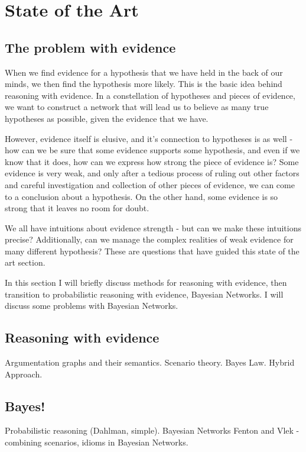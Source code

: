 
\chapter[State of the Art]{State of the Art}

\section{The problem with evidence}

When we find evidence for a hypothesis that we have held in the back of our minds, we then find the hypothesis more likely. 
This is the basic idea behind reasoning with evidence. In a constellation of hypotheses and pieces of evidence, we want
to construct a network that will lead us to believe as many true hypotheses as possible, given the evidence that we have.

However, evidence itself is elusive, and it's connection to hypotheses is as well - how can we be sure that some evidence supports
some hypothesis, and even if we know that it does, how can we express how strong the piece of evidence is? Some evidence
is very weak, and only after a tedious process of ruling out other factors and careful investigation and collection of other pieces
of evidence, we can come to a conclusion about a hypothesis. On the other hand, some evidence is so strong that it leaves no room for doubt.

We all have intuitions about evidence strength - but can we make these intuitions precise? Additionally, can we manage the complex
realities of weak evidence for many different hypothesis? These are questions that have guided this state of the art section.

In this section I will briefly discuss methods for reasoning with evidence, then transition to probabilistic reasoning with evidence,
Bayesian Networks. I will discuss some problems with Bayesian Networks.

\section{Reasoning with evidence}
Argumentation graphs and their semantics.
Scenario theory.
Bayes Law.
Hybrid Approach.

\section{Bayes!}
Probabilistic reasoning (Dahlman, simple).
Bayesian Networks
Fenton and Vlek - combining scenarios, idioms in Bayesian Networks.

